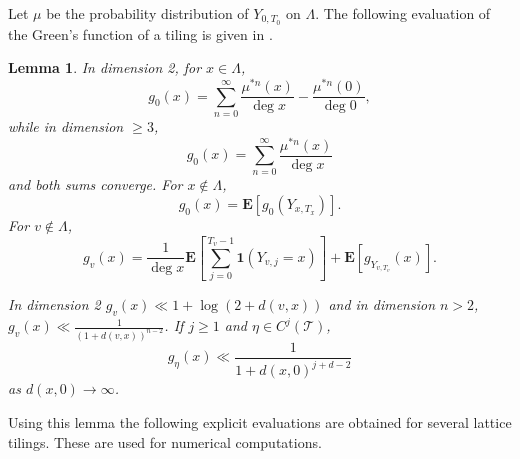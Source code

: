 \documentclass[a4paper, 12pt, notitlepage]{amsart}
\newcommand{\one}{\mathbf{1}}
\newcommand{\E}{\mathbf{E}}
\newcommand{\sT}{\mathscr{T}}
\newtheorem{lemma}[theorem]{Lemma}
\theoremstyle{remark}
\begin{document}
Let $\mu$ be the probability distribution of $Y_{0,T_0}$ on $\Lambda$.  
The following evaluation of the Green's function of a tiling is given in \cite{HS19}.
\begin{lemma}
 In dimension 2, for $x \in \Lambda$,
 \begin{equation}
  g_0(x) =  \sum_{n=0}^\infty \frac{\mu^{*n}(x)}{\deg x} - \frac{\mu^{*n}(0)}{\deg 0},
 \end{equation}
while in dimension $\geq 3$, 
\begin{equation}
g_0(x) =  \sum_{n=0}^\infty \frac{\mu^{*n}(x)}{\deg x}
\end{equation}
and both sums converge. 
For $x \not \in \Lambda$,
\begin{equation}
 g_0(x) = \E[g_0(Y_{x, T_x})].
\end{equation}
 For $v \not \in \Lambda$, 
 \begin{equation}
  g_v(x) = \frac{1}{\deg x} \E\left[\sum_{j=0}^{T_v-1} \one(Y_{v,j}=x) \right] + \E\left[g_{Y_{v, T_v}}(x)\right].
 \end{equation}


In dimension 2 $g_v(x) \ll 1 + \log (2 + d(v,x))$ and in dimension $n > 2$, $g_v(x) \ll \frac{1}{(1 +d(v,x))^{n-2}}$. If $j \geq 1$ and $\eta \in C^j(\sT)$, 
\[
 g_\eta(x) \ll \frac{1}{1 + d(x,0)^{j + d-2}}
\]
as $d(x,0) \to \infty$.
\end{lemma}
 


Using this lemma the following explicit evaluations are obtained for several lattice tilings.  These are used for numerical computations.
\end{document}
